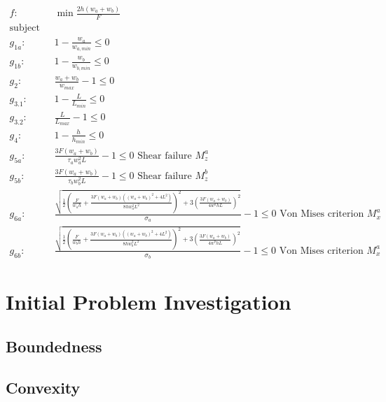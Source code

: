 \begin{align}
	f: & \min \frac{2h \left(w_a + w_b\right)}{F} \nonumber \\
	\text{subject to:} & \nonumber \\
	g_{1a}:& 1 - \frac{w_a}{w_{a,min}}  \le 0 \\
	g_{1b}:& 1 - \frac{w_b}{w_{b,min}}  \le 0 \\
	g_2:& \frac{w_a + w_b}{w_{max}}  - 1 \le 0 \\
	g_{3.1}:& 1 - \frac{L}{L_{min}} \le 0 \\
	g_{3.2}:&\frac{L}{L_{max}} - 1  \le 0 \\
	g_4:& 1 - \frac{h}{h_{min}} \le 0 \\
	g_{5a}: & \frac{ 3 F \left(w_a + w_b \right) }{ \tau_a w_a ^2 L} - 1 \le 0					\text{ Shear failure } M_z^a \\
	g_{5b}: & \frac{ 3 F \left(w_a + w_b \right) }{ \tau_b w_b ^2 L} - 1 \le 0					\text{ Shear failure } M_z^b \\
	g_{6a}:& \frac{\sqrt{\frac{1}{2} \left( \frac{F}{w_a  h} + 	\frac{ 3 F \left(w_a + w_b \right) \left(\left(w_a + w_b \right) ^2 + 4L^2 \right)  }{ 8h w_a^2 L^2 }   \right)^2+ 3\left(	\frac{ 3 F \left(w_a + w_b \right) }{ 4  w^a h L}  \right) ^2}	} { \sigma_a} - 1	\le 0	\text{ Von Mises criterion } M_x^a \\
	g_{6b}:& \frac{\sqrt{\frac{1}{2} \left( \frac{F}{w_b  h} + 	\frac{ 3 F \left(w_a + w_b \right) \left(\left(w_a + w_b \right) ^2 + 4L^2 \right)  }{ 8h w_b^2 L^2 }   \right)^2+ 3\left(	\frac{ 3 F \left(w_a + w_b \right) }{ 4  w^b h L}  \right) ^2}	} { \sigma_b} - 1	\le 0	\text{ Von Mises criterion } M_x^a 
\end{align}


\section{Initial Problem Investigation}

\subsection{Boundedness}

\subsection{Convexity}

